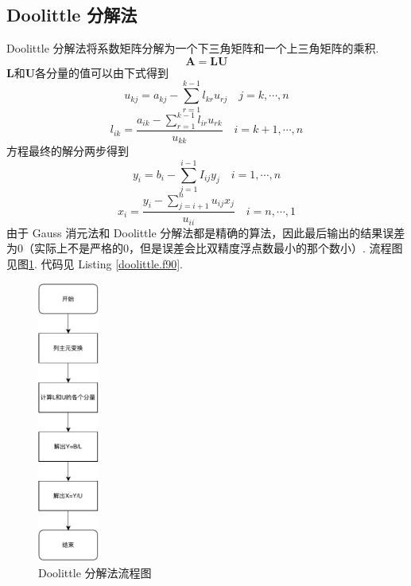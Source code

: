 \documentclass{article}
\begin{document}
	\subsection{Doolittle 分解法}
	Doolittle 分解法将系数矩阵分解为一个下三角矩阵和一个上三角矩阵的乘积.
	\[
	\bm{A}=\bm{L}\bm{U}
	\]
	$\bm{L}$和$\bm{U}$各分量的值可以由下式得到
	\[
	u_{k j}=a_{k j}-\sum_{r=1}^{k-1} l_{k r} u_{r j} \quad j=k,\cdots,n
	\]
	\[
	l_{i k}=\frac{a_{i k}-\sum_{r=1}^{k-1} l_{i r} u_{r k}}{u_{k k}} \quad i=k+1,\cdots,n
	\]
	方程最终的解分两步得到
	\[
	y_{i}=b_{i}-\sum_{j=1}^{i-1} I_{i j} y_{j} \quad i=1, \cdots, n
	\]
	\[
	x_{i}=\frac{y_{i}-\sum_{j=i+1}^{n} u_{i j} x_{j}}{u_{i i}} \quad i=n, \cdots, 1
	\]
	由于 Gauss 消元法和 Doolittle 分解法都是精确的算法，因此最后输出的结果误差为0（实际上不是严格的0，但是误差会比双精度浮点数最小的那个数小）. 流程图见图\ref{fig:doolittle}. 代码见 Listing \ref{doolittle.f90}.
	\begin{figure}[h!tb]
		\centering
		\includegraphics[width=0.18\textwidth]{./utils/doolittle.pdf}
		\caption{ Doolittle 分解法流程图\label{fig:doolittle}}
	\end{figure}
	
\end{document}
